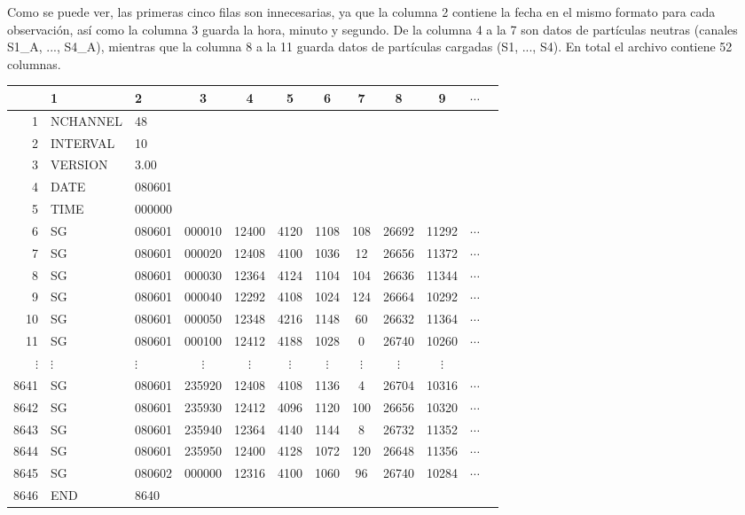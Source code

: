 Como se puede ver, las primeras cinco filas son innecesarias, ya que la columna 2 contiene la fecha en el mismo formato para cada observación, así como la columna 3 guarda la hora, minuto y segundo. De la columna 4 a la 7 son datos de partículas neutras (canales S1\_A, ..., S4\_A), mientras que la columna 8 a la 11 guarda datos de partículas cargadas (S1, ..., S4). En total el archivo contiene 52 columnas.\\


\begin{table}[H]
  \centering
\begin{tabular}{r|llccccccccc}
  & 1 & 2 & 3 & 4 & 5 & 6 & 7 & 8 & 9  & $\cdots$\\
\hline

 1 & NCHANNEL &         48 &        &      &     &   &    &  &  &       \\

 2 & INTERVAL &         10 &        &        &      &      &    &  & &   \\

 3 & VERSION &       3.00 &        &       &       &      &     &  & &       \\

 4 & DATE &      080601 &        &         &       &      &    &    & &      \\

 5  & TIME &      000000 &        &        &       &      &   &   & &     \\

  6 & SG & 080601 & 000010 & 12400 & 4120 & 1108 & 108 & 26692 & 11292  & $\cdots$\\ 
  7 & SG & 080601 & 000020 & 12408 & 4100 & 1036 &  12 & 26656 & 11372  & $\cdots$\\ 
  8 & SG & 080601 & 000030 & 12364 & 4124 & 1104 & 104 & 26636 & 11344  & $\cdots$\\ 
  9 & SG & 080601 & 000040 & 12292 & 4108 & 1024 & 124 & 26664 & 10292 & $\cdots$\\ 
  10 & SG & 080601 & 000050 & 12348 & 4216 & 1148 &  60 & 26632 & 11364 & $\cdots$\\ 
  11 & SG & 080601 & 000100 & 12412 & 4188 & 1028 &   0 & 26740 & 10260 & $\cdots$\\ 
  $\vdots$ & $\vdots$ & $\vdots$ & $\vdots$ & $\vdots$ & $\vdots$  & $\vdots$ & $\vdots$ & $\vdots$ & $\vdots$ &  \\
  8641 & SG & 080601 & 235920 & 12408 & 4108 & 1136 &   4 & 26704 & 10316 & $\cdots$\\ 
  8642 & SG & 080601 & 235930 & 12412 & 4096 & 1120 & 100 & 26656 & 10320 & $\cdots$\\ 
  8643 & SG & 080601 & 235940 & 12364 & 4140 & 1144 &   8 & 26732 & 11352 & $\cdots$\\ 
  8644 & SG & 080601 & 235950 & 12400 & 4128 & 1072 & 120 & 26648 & 11356 & $\cdots$\\ 
  8645 & SG & 080602 & 000000 & 12316 & 4100 & 1060 &  96 & 26740 & 10284 & $\cdots$\\ 
  8646 & END & 8640 &  &  &  &  &  &  &  & \\ 


\end{tabular}
\end{table}
